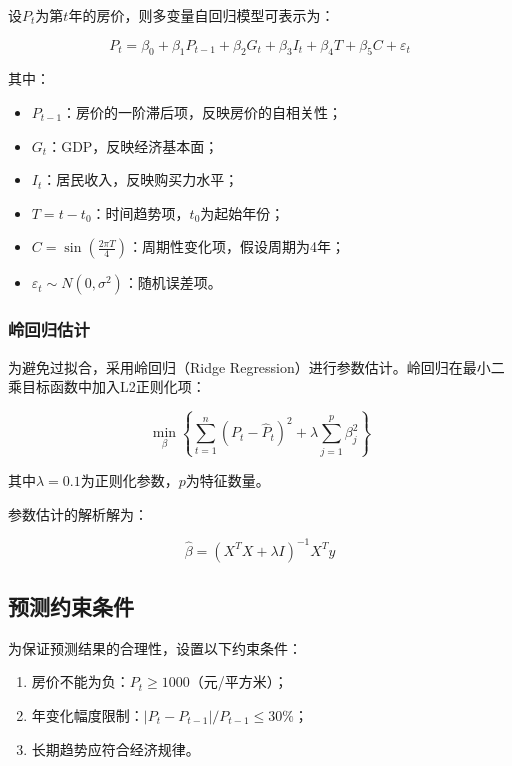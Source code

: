 \documentclass[12pt,a4paper]{article}
\begin{document}
设$P_t$为第$t$年的房价，则多变量自回归模型可表示为：

\begin{equation}
    P_t = \beta_0 + \beta_1 P_{t-1} + \beta_2 G_t + \beta_3 I_t + \beta_4 T + \beta_5 C + \varepsilon_t
\end{equation}

其中：
\begin{itemize}
    \item $P_{t-1}$：房价的一阶滞后项，反映房价的自相关性；
    \item $G_t$：GDP，反映经济基本面；
    \item $I_t$：居民收入，反映购买力水平；
    \item $T = t - t_0$：时间趋势项，$t_0$为起始年份；
    \item $C = \sin(\frac{2\pi T}{4})$：周期性变化项，假设周期为4年；
    \item $\varepsilon_t \sim N(0, \sigma^2)$：随机误差项。
\end{itemize}

\subsubsection{岭回归估计}

为避免过拟合，采用岭回归（Ridge Regression）进行参数估计。岭回归在最小二乘目标函数中加入L2正则化项：

\begin{equation}
    \min_{\beta} \left\{ \sum_{t=1}^{n}(P_t - \hat{P}_t)^2 + \lambda \sum_{j=1}^{p}\beta_j^2 \right\}
\end{equation}

其中$\lambda = 0.1$为正则化参数，$p$为特征数量。

参数估计的解析解为：

\begin{equation}
    \hat{\beta} = (X^T X + \lambda I)^{-1} X^T y
\end{equation}

\subsection{预测约束条件}

为保证预测结果的合理性，设置以下约束条件：
\begin{enumerate}
    \item 房价不能为负：$P_t \geq 1000$（元/平方米）；
    \item 年变化幅度限制：$|P_t - P_{t-1}| / P_{t-1} \leq 30\%$；
    \item 长期趋势应符合经济规律。
\end{enumerate}
\end{document}
